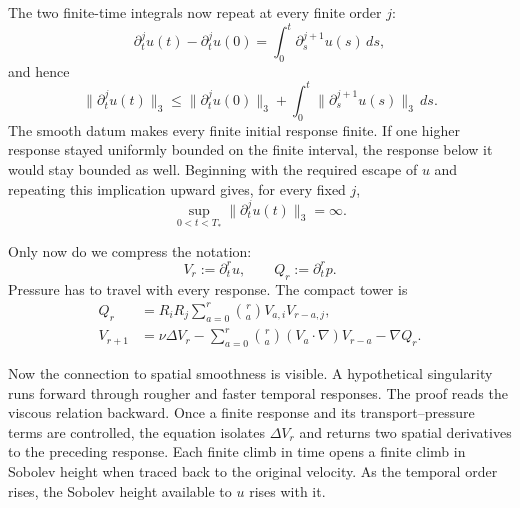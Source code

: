 The two finite-time integrals now repeat at every finite order \(j\):
\[
\partial_t^ju(t)-\partial_t^ju(0)
=\int_0^t\partial_s^{j+1}u(s)\,ds,
\]
and hence
\[
\|\partial_t^ju(t)\|_3
\leq \|\partial_t^ju(0)\|_3
  +\int_0^t\|\partial_s^{j+1}u(s)\|_3\,ds.
\]
The smooth datum makes every finite initial response finite.  If one higher
response stayed uniformly bounded on the finite interval, the response below
it would stay bounded as well.  Beginning with the required escape of \(u\)
and repeating this implication upward gives, for every fixed \(j\),
\[
\sup_{0<t<T_*}\|\partial_t^ju(t)\|_3=\infty.
\]

Only now do we compress the notation:
\[
V_r:=\partial_t^ru,
\qquad
Q_r:=\partial_t^rp.
\]
Pressure has to travel with every response.  The compact tower is
\[
\begin{aligned}
Q_r
&=R_iR_j\sum_{a=0}^{r}\binom ra V_{a,i}V_{r-a,j},\\
V_{r+1}
&=\nu\Delta V_r
  -\sum_{a=0}^{r}\binom ra(V_a\!\cdot\nabla)V_{r-a}
  -\nabla Q_r.
\end{aligned}
\]

Now the connection to spatial smoothness is visible.  A hypothetical
singularity runs forward through rougher and faster temporal responses.  The
proof reads the viscous relation backward.  Once a finite response and its
transport--pressure terms are controlled, the equation isolates
\(\Delta V_r\) and returns two spatial derivatives to the preceding response.
Each finite climb in time opens a finite climb in Sobolev height when traced
back to the original velocity.  As the temporal order rises, the Sobolev
height available to \(u\) rises with it.

